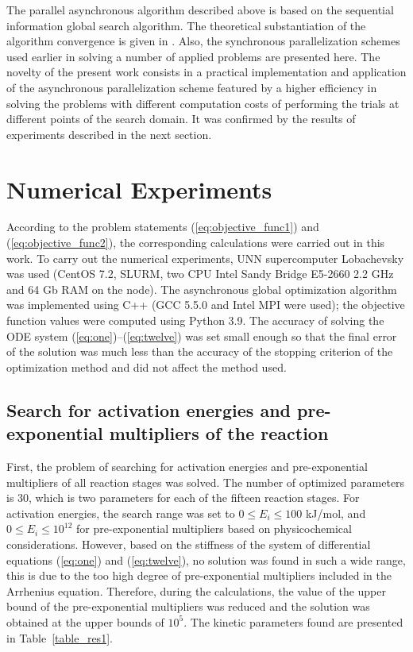 \documentclass{svproc}
\begin{document}
The parallel asynchronous algorithm described above is based on the sequential information global search algorithm. The theoretical substantiation of the algorithm convergence is given in \cite{Strongin2000}. Also, the synchronous parallelization schemes used earlier in solving a number of applied problems \cite{Kalyulin2017,Modorskii2016} are presented here.
The novelty of the present work consists in a practical implementation and application of the asynchronous parallelization scheme featured by a higher efficiency in solving the problems with different computation costs of performing the trials at different points of the search domain. 
It was confirmed by the results of experiments described in the next section.

\section{Numerical Experiments}\label{Sec_Exp}

According to the problem statements (\ref{eq:objective_func1}) and (\ref{eq:objective_func2}), the corresponding calculations were carried out in this work.
To carry out the numerical experiments, UNN supercomputer Lobachevsky was used (CentOS 7.2, SLURM, two CPU Intel Sandy Bridge E5-2660 2.2 GHz and 64 Gb RAM on the node). The asynchronous global optimization algorithm was implemented using C++ (GCC 5.5.0 and Intel MPI were used); the objective function values were computed using Python 3.9.
\textcolor[rgb]{1,0,0}{The accuracy of solving the ODE system (\ref{eq:one})--(\ref{eq:twelve}) was set small enough so that the final error of the solution was much less than the accuracy of the stopping criterion of the optimization method and did not affect the method used.}

\subsection{Search for activation energies and pre-exponential multipliers of the reaction}

First, the problem of searching for activation energies and pre-exponential multipliers of all reaction stages was solved. The number of optimized parameters is 30, which is two parameters for each of the fifteen reaction stages. For activation energies, the search range was set to $0 \leq E_i \leq 100$ kJ/mol, and $0 \leq E_i \leq 10^{12}$ for pre-exponential multipliers based on physicochemical considerations. However, based on the stiffness of the system of differential equations (\ref{eq:one}) and (\ref{eq:twelve}), no solution was found in such a wide range, this is due to the too high degree of pre-exponential multipliers included in the Arrhenius equation. Therefore, during the calculations, the value of the upper bound of the pre-exponential multipliers was reduced and the solution was obtained at the upper bounds of $10^5$. The kinetic parameters found are presented in Table~\ref{table_res1}.
\end{document}
